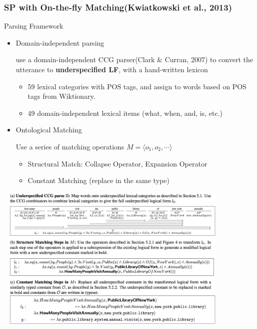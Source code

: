 \documentclass{beamer}
\begin{document}
\begin{frame}
    \frametitle{SP with On-the-fly Matching(Kwiatkowski et al., 2013)}

     {
        Parsing Framework
        \begin{itemize}
            \item Domain-independent parsing
                
                use a domain-independent CCG parser(Clark \& Curran, 2007) to convert 
                the utterance to {\bf underspecified LF}, with a hand-written lexicon
                \begin{itemize}
                    \item 59 lexical categories with POS tags, and assign to words based on POS 
                        tags from Wiktionary.
                    \item 49 domain-independent lexical items (what, when, and, is, etc.)
                \end{itemize}

            \item Ontological Matching
                
                Use a series of matching operations $M = \langle o_1, o_2, \cdots \rangle$
                \begin{itemize}
                    \item Structural Match: Collapse Operator, Expansion Operator
                    \item Constant Matching (replace in the same type)
                \end{itemize}

        \end{itemize}
    }

     {
        \begin{center}
            \includegraphics[width=11.5cm,height=7cm]{img/ccg-fb-parse.png}
        \end{center}
    }


\end{frame}
\end{document}
